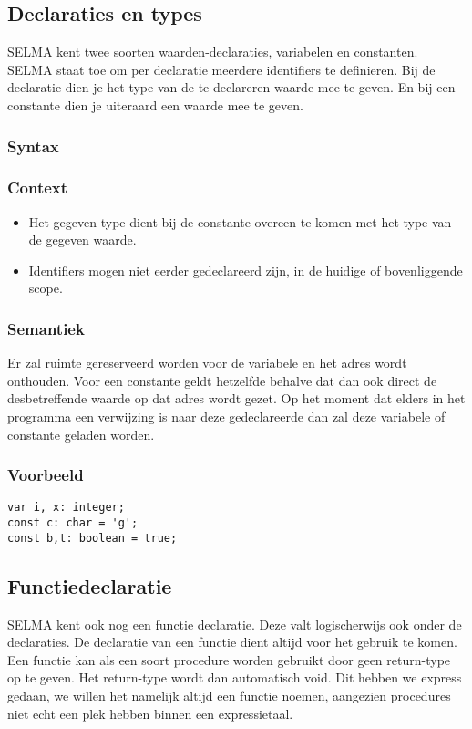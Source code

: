 \documentclass[]{article}
\begin{document}
\subsection{Declaraties en types}
SELMA kent twee soorten waarden-declaraties, variabelen en constanten. SELMA staat toe om per declaratie meerdere identifiers te definieren. Bij de declaratie dien je het type van de te declareren waarde mee te geven. En bij een constante dien je uiteraard een waarde mee te geven.
\subsubsection{Syntax}

\subsubsection{Context}
\begin{itemize}
\item Het gegeven type dient bij de constante overeen te komen met het type van de gegeven waarde.
\item Identifiers mogen niet eerder gedeclareerd zijn, in de huidige of bovenliggende scope.
\end{itemize}
\subsubsection{Semantiek}
Er zal ruimte gereserveerd worden voor de variabele en het adres wordt onthouden. Voor een constante geldt hetzelfde behalve dat dan ook direct de desbetreffende waarde op dat adres wordt gezet. Op het moment dat elders in het programma een verwijzing is naar deze gedeclareerde dan zal deze variabele of constante geladen worden.
\subsubsection{Voorbeeld}
\begin{lstlisting}[style=SELMA]
var i, x: integer;
const c: char = 'g';
const b,t: boolean = true;
\end{lstlisting}

\subsection{Functiedeclaratie}
SELMA kent ook nog een functie declaratie. Deze valt logischerwijs ook onder de declaraties. De declaratie van een functie dient altijd voor het gebruik te komen. Een functie kan als een soort procedure worden gebruikt door geen return-type op te geven. Het return-type wordt dan automatisch void. Dit hebben we express gedaan, we willen het namelijk altijd een functie noemen, aangezien procedures niet echt een plek hebben binnen een expressietaal.
\end{document}
